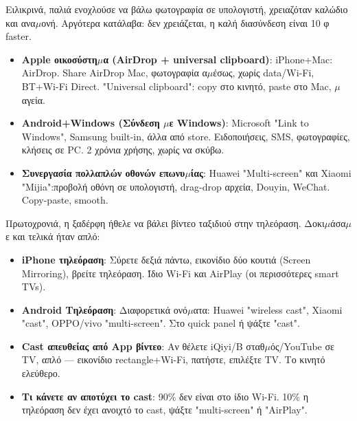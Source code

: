 


Ειλικρινά, παλιά ενοχλούσε να βάλω φωτογραφία σε υπολογιστή, χρειαζόταν καλώδιο και ανα$\mu$ονή. Αργότερα κατάλαβα: δεν χρειάζεται, η καλή διασύνδεση είναι 10 φ faster.

\begin{itemize}
  \item \textbf{Apple οικοσύστη$\mu$α (AirDrop + universal clipboard)}: iPhone+Mac: AirDrop. Share AirDrop Mac, φωτογραφία α$\mu$έσως, χωρίς data/Wi-Fi, BT+Wi-Fi Direct. "Universal clipboard": copy στο κινητό, paste στο Mac, $\mu$αγεία.
  \item \textbf{Android+Windows (Σύνδεση $\mu$ε Windows)}: Microsoft "Link to Windows", Samsung built-in, άλλα από store. Ειδοποιήσεις, SMS, φωτογραφίες, κλήσεις σε PC. 2 χρόνια χρήσης, χωρίς να σκύβω.
  \item \textbf{Συνεργασία πολλαπλών οθονών επωνυ$\mu$ίας}: Huawei "Multi-screen" και Xiaomi "Mijia":προβολή οθόνη σε υπολογιστή, drag-drop αρχεία, Douyin, WeChat. Copy-paste, smooth.
\end{itemize}


Πρωτοχρονιά, η ξαδέρφη ήθελε να βάλει βίντεο ταξιδιού στην τηλεόραση. Δοκι$\mu$άσα$\mu$ε και τελικά ήταν απλό:

\begin{itemize}
  \item \textbf{iPhone τηλεόραση}: Σύρετε δεξιά πάντω, εικονίδιο δύο κουτιά (Screen Mirroring), βρείτε τηλεόραση. Ίδιο Wi-Fi και AirPlay (οι περισσότερες smart TVs).
  \item \textbf{Android Τηλεόραση}: Διαφορετικά ονό$\mu$ατα: Huawei "wireless cast", Xiaomi "cast", OPPO/vivo "multi-screen". Στο quick panel ή ψάξτε "cast".
  \item \textbf{Cast απευθείας από App βίντεο}: Αν θέλετε iQiyi/B σταθ$\mu$ός/YouTube σε TV, απλό — εικονίδιο rectangle+Wi-Fi, πατήστε, επιλέξτε TV. Το κινητό ελεύθερο.
  \item \textbf{Τι κάνετε αν αποτύχει το cast}: 90\% δεν είναι στο ίδιο Wi-Fi. 10\% η τηλεόραση δεν έχει ανοιχτό το cast, ψάξτε "multi-screen" ή "AirPlay".
\end{itemize}

